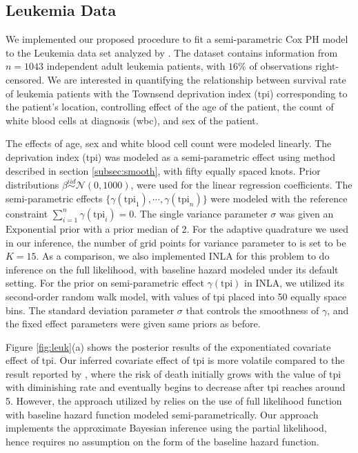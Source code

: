 \documentclass[ba]{imsart}
\begin{document}
\subsection{Leukemia Data}\label{subsec:leuk}

We implemented our proposed procedure to fit a semi-parametric Cox PH model to the Leukemia data set analyzed by \cite{inlacoxph}. The dataset contains information from $n=1043$ independent adult leukemia patients, with $16\%$ of observations right-censored. We are interested in quantifying the relationship between survival rate of leukemia patients with the Townsend deprivation index (tpi) corresponding to the patient's location, controlling effect of the age of the patient, the count of white blood cells at diagnosis (wbc), and sex of the patient.

The effects of age, sex and white blood cell count were modeled linearly. The deprivation index (tpi) was modeled as a semi-parametric effect using method described in section \ref{subsec:smooth}, with fifty equally spaced knots. Prior distributions $\beta \stackrel{iid}{\sim} \mathcal{N}(0, 1000)$, were used for the linear regression coefficients. The semi-parametric effects $\{\gamma(\text{tpi}_1), \cdots, \gamma(\text{tpi}_n)\}$ were modeled with the reference constraint $\sum_{i=1}^{n}\gamma(\text{tpi}_i) = 0$. The single variance parameter $\sigma$ was given an $\text{Exponential}$ prior with a prior median of 2. For the adaptive quadrature we used in our inference, the number of grid points for variance parameter to is set to be $K = 15$. As a comparison, we also implemented INLA for this problem to do inference on the full likelihood, with baseline hazard modeled under its default setting. For the prior on semi-parametric effect $\gamma(\text{tpi})$ in INLA, we utilized its second-order random walk model, with values of tpi placed into 50 equally space bins. The standard deviation parameter $\sigma$ that controls the smoothness of $\gamma$, and the fixed effect parameters were given same priors as before.

Figure \ref{fig:leuk}(a) shows the posterior results of the exponentiated covariate effect of tpi. Our inferred covariate effect of tpi is more volatile compared to the result reported by \cite{inlacoxph}, where the risk of death initially grows with the value of tpi with diminishing rate and eventually begins to decrease after tpi reaches around 5. However, the approach utilized by \cite{inlacoxph} relies on the use of full likelihood function with baseline hazard function modeled semi-parametrically. Our approach implements the approximate Bayesian inference using the partial likelihood, hence requires no assumption on the form of the baseline hazard function. 
\end{document}
